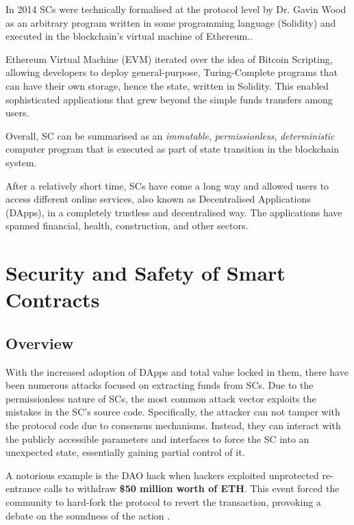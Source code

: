 \documentclass[oneside]{ecsproject}     %
\begin{document}
In 2014 SCs were technically formalised at the protocol level by Dr. Gavin Wood as an arbitrary program
written in some programming language (Solidity) and executed in the blockchain's virtual machine of Ethereum.\cite{eth_yellow_paper}.

Ethereum Virtual Machine (EVM) iterated over the idea of Bitcoin Scripting\cite{bitcoin}, allowing developers to deploy general-purpose, Turing-Complete
programs that can have their own storage, hence the state, written in Solidity\cite{solidity_docs}. This enabled sophisticated applications that grew beyond
the simple funds transfers among users.

Overall, SC can be summarised as an \textit{immutable}, \textit{permissionless}, \textit{deterministic} computer program
that is executed as part of state transition in the blockchain system\cite{hardvard_sc}\cite{eth_yellow_paper}. 

After a relatively short time, SCs have come a long way and allowed users to access different online services, also known as Decentralised Applications (DApps), in a completely trustless and decentralised way.
The applications have spanned financial, health, construction\cite{cad_blockchain}, and other sectors.

\chapter{Security and Safety of Smart Contracts}

\section{Overview}

With the increased adoption of DApps and total value locked in them, 
there have been numerous attacks focused on extracting funds from SCs. 
Due to the permissionless nature of SCs, the most common attack vector exploits the mistakes in the SC's source code.
Specifically, the attacker can not tamper with the protocol code due to consensus mechanisms.
Instead, they can interact with the publicly accessible parameters and interfaces to force the SC into an unexpected state, essentially gaining partial control of it.

A notorious example is the DAO hack when hackers exploited unprotected re-entrance calls to withdraw \textbf{\$50 million worth of ETH}. 
This event forced the community to hard-fork the protocol to revert the transaction, provoking a debate on the soundness of the action \cite{the_dao}.
\end{document}
